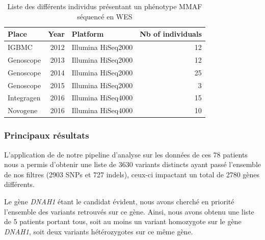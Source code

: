 \documentclass[12pt,a4paper,twoside]{ugathesis}
\theoremstyle{definition}
\theoremstyle{definition}
\theoremstyle{definition}
\theoremstyle{remark}
\begin{document}
\begin{longtable}[t]{lrlr}
\caption{\label{tab:tabrunbigmmaf}Liste des différents individus présentant un phénotype MMAF séquencé en WES}\\
\toprule
Place & Year & Platform & Nb of individuals\\
\midrule
IGBMC & 2012 & Illumina HiSeq2000 & 12\\
Genoscope & 2013 & Illumina HiSeq2000 & 12\\
Genoscope & 2014 & Illumina HiSeq2000 & 25\\
Genoscope & 2015 & Illumina HiSeq2000 & 3\\
Integragen & 2016 & Illumina HiSeq4000 & 15\\
Novogene & 2016 & Illumina HiSeq4000 & 10\\
\bottomrule
\end{longtable}



\newpage

\subsubsection{Principaux résultats}\label{principaux-resultats-4}

L'application de de notre pipeline d'analyse sur les données de ces 78
patients nous a permis d'obtenir une liste de 3630 variants distincts
ayant passé l'ensemble de nos filtres (2903 SNPs et 727 indels), ceux-ci
impactant un total de 2780 gènes différents.

Le gène \emph{DNAH1} étant le candidat évident, nous avons cherché en
priorité l'ensemble des variants retrouvés sur ce gène. Ainsi, nous
avons obtenu une liste de 5 patients portant tous, soit au moins un
variant homozygote sur le gène \emph{DNAH1}, soit deux variants
hétérozygotes sur ce même gène.
\end{document}

